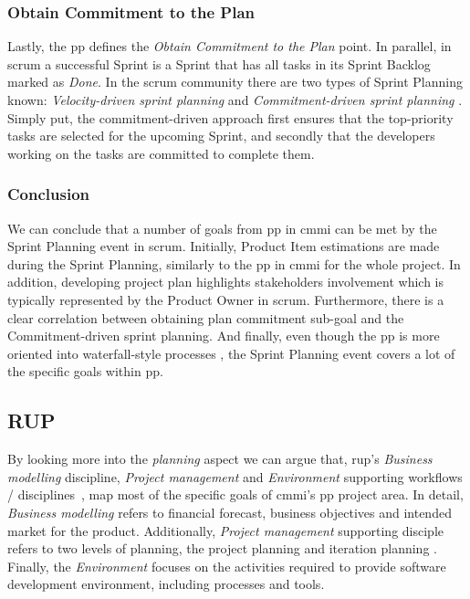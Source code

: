 \subsubsection{Obtain Commitment to the Plan}

Lastly, the \ac{pp} defines the \textit{Obtain Commitment to the Plan} point. In parallel, in \ac{scrum} a successful Sprint is a Sprint that has all tasks in its Sprint Backlog marked as \textit{Done}. In the \ac{scrum} community there are two types of Sprint Planning known: \textit{Velocity-driven sprint planning} and \textit{Commitment-driven sprint planning} \citep{www:www.mountaingoatsoftware.com}. Simply put, the commitment-driven approach first ensures that the top-priority tasks are selected for the upcoming Sprint, and secondly that the developers working on the tasks are committed to complete them. 

\subsubsection{Conclusion}
We can conclude that a number of goals from \acrlong{pp} in \ac{cmmi} can be met by the Sprint Planning event in \ac{scrum}. 
Initially, Product Item estimations are made during the Sprint Planning, similarly to the \acs{pp} in \ac{cmmi} for the whole project. In addition, developing project plan highlights stakeholders involvement which is typically represented by the Product Owner in \ac{scrum}. Furthermore, there is a clear correlation between obtaining plan commitment sub-goal and the Commitment-driven sprint planning. And finally, even though the \acrlong{pp} is more oriented into waterfall-style processes \citep[page 4]{gallagher2001rational}, the Sprint Planning event covers a lot of the specific goals within \ac{pp}.


\subsection{RUP}

By looking more into the \textit{planning} aspect we can argue that, \ac{rup}'s \textit{Business modelling} discipline, \textit{Project management} and \textit{Environment} supporting workflows / disciplines~\citep{kruchten2004rational}, map most of the specific goals of \ac{cmmi}'s \ac{pp} project area. In detail, \textit{Business modelling} refers to financial forecast, business objectives and intended market for the product. Additionally, \textit{Project management} supporting disciple refers to two levels of planning, the project planning and iteration planning \cite{west2002planning}. Finally, the \textit{Environment} focuses on the activities required to provide software development environment, including processes and tools. 

